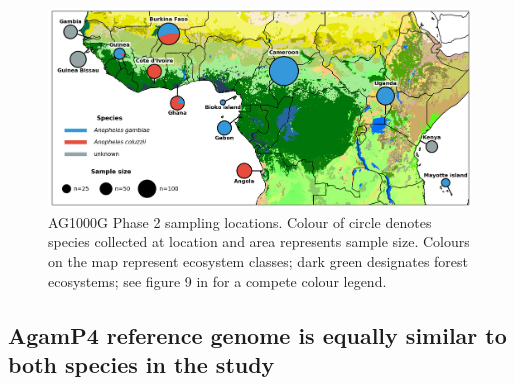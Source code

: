 \documentclass[a4paper,11pt,abstracton,hidelinks]{scrartcl}
\begin{document}
\begin{figure}[h]
	\begin{center}
		\includegraphics*[width=5.8in]{artwork/collection_site_map.jpg}
	\end{center}
	\caption{AG1000G Phase 2 sampling locations. Colour of circle denotes species collected at location and area represents sample size. Colours on the map represent ecosystem classes; dark green designates forest ecosystems; see figure 9 in \cite{sayre2013} for a compete colour legend.}
	\label{sample_map}
\end{figure}


%


\subsection*{AgamP4 reference genome is equally similar to both species in the study}
\end{document}
